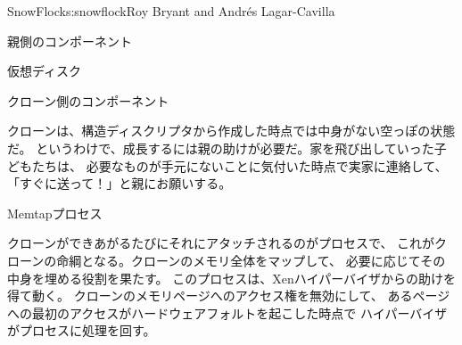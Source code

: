 \begin{aosachapter}{SnowFlock}{s:snowflock}{Roy Bryant and Andr\'e{s} Lagar-Cavilla}
\begin{aosasect1}{親側のコンポーネント}
\begin{aosasect2}{仮想ディスク}
\end{aosasect2}

\end{aosasect1}

\begin{aosasect1}{クローン側のコンポーネント}

クローンは、構造ディスクリプタから作成した時点では中身がない空っぽの状態だ。
というわけで、成長するには親の助けが必要だ。家を飛び出していった子どもたちは、
必要なものが手元にないことに気付いた時点で実家に連絡して、
「すぐに送って！」と親にお願いする。

\begin{aosasect2}{Memtapプロセス}

クローンができあがるたびにそれにアタッチされるのがプロセスで、
これがクローンの命綱となる。クローンのメモリ全体をマップして、
必要に応じてその中身を埋める役割を果たす。
このプロセスは、Xenハイパーバイザからの助けを得て動く。
クローンのメモリページへのアクセス権を無効にして、
あるページへの最初のアクセスがハードウェアフォルトを起こした時点で
ハイパーバイザがプロセスに処理を回す。


\end{aosasect2}
\end{aosasect1}
\end{aosachapter}
